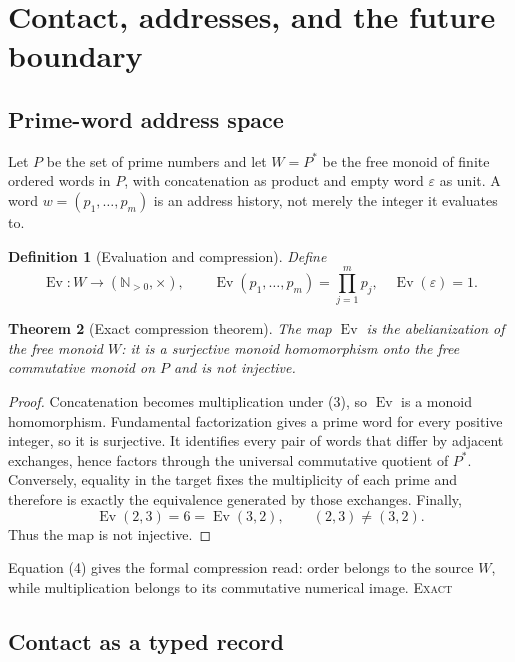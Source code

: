 \documentclass[10pt]{article}
\newtheorem{definition}{Definition}[section]
\newtheorem{theorem}[definition]{Theorem}
\theoremstyle{remark}
\newcommand{\Ev}{\operatorname{Ev}}
\newcommand{\N}{\mathbb N}
\newcommand{\cstatus}[1]{\hfill\textsc{#1}}
\newcommand{\exact}{\textsc{Exact}}
\begin{document}
\section{Contact, addresses, and the future boundary}

\subsection{Prime-word address space}

Let $P$ be the set of prime numbers and let $W=P^*$ be the free monoid of
finite ordered words in $P$, with concatenation as product and empty word
$\varepsilon$ as unit.  A word $w=(p_1,\ldots,p_m)$ is an address history,
not merely the integer it evaluates to.

\begin{definition}[Evaluation and compression]\label{def:ev}
Define
\[
 \Ev:W\longrightarrow(\N_{>0},\times),\qquad
 \Ev(p_1,\ldots,p_m)=\prod_{j=1}^{m}p_j,
 \quad \Ev(\varepsilon)=1.
\tag{3}
\]
\end{definition}

\begin{theorem}[Exact compression theorem]\label{thm:ev}
The map $\Ev$ is the abelianization of the free monoid $W$: it is a
surjective monoid homomorphism onto the free commutative monoid on $P$ and is
not injective.
\end{theorem}

\begin{proof}
Concatenation becomes multiplication under (3), so $\Ev$ is a monoid
homomorphism.  Fundamental factorization gives a prime word for every
positive integer, so it is surjective.  It identifies every pair of words
that differ by adjacent exchanges, hence factors through the universal
commutative quotient of $P^*$.  Conversely, equality in the target fixes the
multiplicity of each prime and therefore is exactly the equivalence generated
by those exchanges.  Finally,
\[
 \Ev(2,3)=6=\Ev(3,2),\qquad (2,3)\ne(3,2).
\tag{4}
\]
Thus the map is not injective.
\end{proof}

Equation (4) gives the formal compression read: order belongs to the source
$W$, while multiplication belongs to its commutative numerical image.
\cstatus{\exact}

\subsection{Contact as a typed record}
\end{document}

